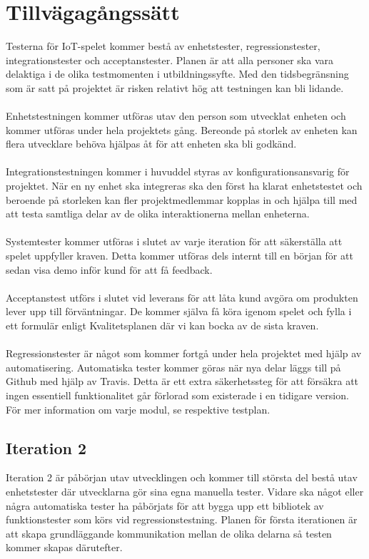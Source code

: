 \documentclass[10pt]{article}
\begin{document}
\section{Tillvägagångssätt}
	Testerna för IoT-spelet kommer bestå av enhetstester, regressionstester, integrationstester och acceptanstester. Planen är att alla personer ska vara delaktiga i de olika 		testmomenten i utbildningssyfte. Med den tidsbegränsning som är satt på projektet är risken relativt hög att testningen kan bli lidande. \\
	\\
	Enhetstestningen kommer utföras utav den person som utvecklat enheten och kommer utföras under hela projektets gång. Bereonde på storlek av enheten kan flera utvecklare behöva hjälpas åt för att enheten ska bli godkänd.\\
	\\
	Integrationstestningen kommer i huvuddel styras av konfigurationsansvarig för projektet. När en ny enhet ska integreras ska den först ha klarat enhetstestet och beroende på storleken kan fler projektmedlemmar kopplas in och hjälpa till med att testa samtliga delar av de olika interaktionerna mellan enheterna. \\
	\\
	Systemtester kommer utföras i slutet av varje iteration för att säkerställa att spelet uppfyller kraven. Detta kommer utföras dels internt till en början för att sedan visa demo inför kund för att få feedback.  \\ 
	\\
	Acceptanstest utförs i slutet vid leverans för att låta kund avgöra om produkten lever upp till förväntningar. De kommer själva få köra igenom spelet och fylla i ett formulär enligt Kvalitetsplanen där vi kan bocka av de sista kraven. \\
	\\
	Regressionstester är något som kommer fortgå under hela projektet med hjälp av automatisering. Automatiska tester kommer göras när nya delar läggs till på Github med hjälp av Travis. Detta är ett extra säkerhetssteg för att försäkra att ingen essentiell funktionalitet går förlorad som existerade i en tidigare version.\\
	För mer information om varje modul, se respektive testplan.
	
\subsection{Iteration 2}
	Iteration 2 är påbörjan utav utvecklingen och kommer till största del bestå utav enhetstester där utvecklarna gör sina egna manuella tester. Vidare ska något eller några automatiska tester ha påbörjats för att bygga upp ett bibliotek av funktionstester som körs vid regressionstestning. Planen för första iterationen är att skapa grundläggande kommunikation mellan de olika delarna så testen kommer skapas därutefter. 
	
\end{document}
